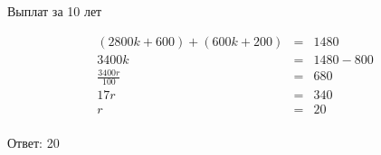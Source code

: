 Выплат за 10 лет

\begin{equation*}
    \begin{array}{rcl}
        (2800k + 600) + (600k + 200) & = & 1480            \\
        3400k                        & = & 1480 - 800      \\
        \frac{3400r}{100}            & = & 680            \\
        17r                          & = & 340            \\
        r                            & = & 20 \\
    \end{array}
\end{equation*}

Ответ: 20